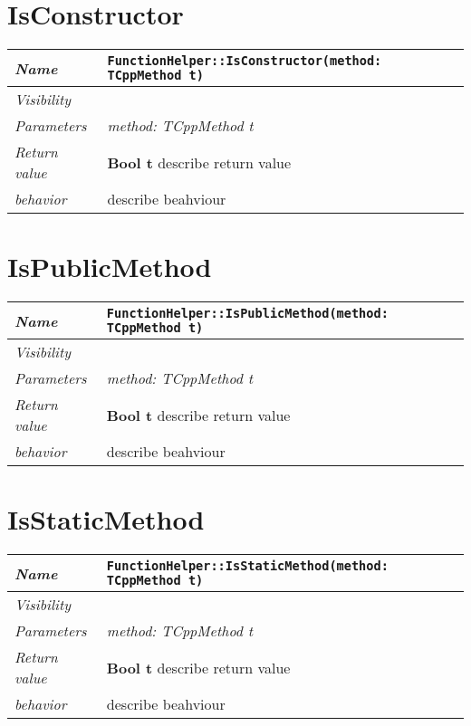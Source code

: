  \section{IsConstructor}
\begin{longtable}{p{3cm} @{\hskip 1cm} p{12cm}}
 \hline
\textit{Name} & \texttt{FunctionHelper::IsConstructor(method: TCppMethod t)}\\
\hline
 \textit{Visibility} & \\
\hline
\textit{Parameters} & \textit{method: TCppMethod t}\\
\hline
\textit{Return value} & \textbf{ Bool t} describe return value\\
  \hline
 \textit{behavior} & describe beahviour \\
\hline
\end{longtable} \pagebreak
 \section{IsPublicMethod}
\begin{longtable}{p{3cm} @{\hskip 1cm} p{12cm}}
 \hline
\textit{Name} & \texttt{FunctionHelper::IsPublicMethod(method: TCppMethod t)}\\
\hline
 \textit{Visibility} & \\
\hline
\textit{Parameters} & \textit{method: TCppMethod t}\\
\hline
\textit{Return value} & \textbf{ Bool t} describe return value\\
  \hline
 \textit{behavior} & describe beahviour \\
\hline
\end{longtable} \pagebreak
 \section{IsStaticMethod}
\begin{longtable}{p{3cm} @{\hskip 1cm} p{12cm}}
 \hline
\textit{Name} & \texttt{FunctionHelper::IsStaticMethod(method: TCppMethod t)}\\
\hline
 \textit{Visibility} & \\
\hline
\textit{Parameters} & \textit{method: TCppMethod t}\\
\hline
\textit{Return value} & \textbf{ Bool t} describe return value\\
  \hline
 \textit{behavior} & describe beahviour \\
\hline
\end{longtable} \pagebreak
